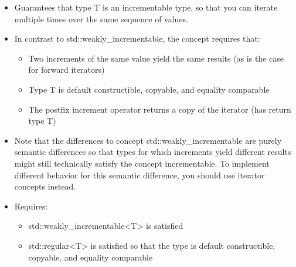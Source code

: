 \begin{itemize}
\item
Guarantees that type T is an incrementable type, so that you can iterate multiple times over the same sequence of values.

\item
In contrast to std::weakly\_incrementable, the concept requires that:

\begin{itemize}
\item
Two increments of the same value yield the same results (as is the case for forward iterators)

\item
Type T is default constructible, copyable, and equality comparable

\item
The postfix increment operator returns a copy of the iterator (has return type T)
\end{itemize}

\item
Note that the differences to concept std::weakly\_incrementable are purely semantic differences so that types for which increments yield different results might still technically satisfy the concept incrementable. To implement different behavior for this semantic difference, you should use iterator concepts instead.

\item
Requires:
\begin{itemize}
\item
std::weakly\_incrementable<T> is satisfied

\item
std::regular<T> is satisfied so that the type is default constructible, copyable, and equality comparable
\end{itemize}
\end{itemize}
